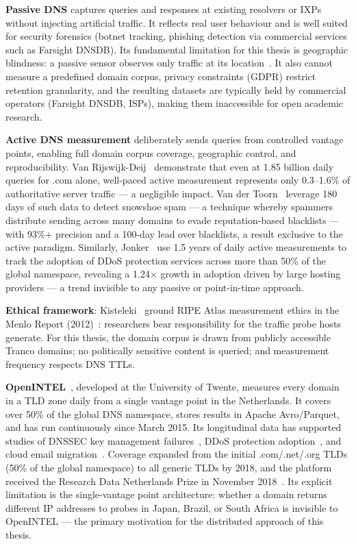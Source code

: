 \textbf{Passive \ac{DNS}} captures queries and responses at existing resolvers or \ac{IXPs} without injecting artificial traffic. It reflects real user behaviour and is well suited for security forensics (botnet tracking, phishing detection via commercial services such as Farsight DNSDB). Its fundamental limitation for this thesis is geographic blindness: a passive sensor observes only traffic at its location~\cite{vanRijswijk2016}. It also cannot measure a predefined domain corpus, privacy constraints (GDPR) restrict retention granularity, and the resulting datasets are typically held by commercial operators (Farsight DNSDB, \ac{ISP}s), making them inaccessible for open academic research.

\textbf{Active \ac{DNS} measurement} deliberately sends queries from controlled vantage points, enabling full domain corpus coverage, geographic control, and reproducibility. Van Rijswijk-Deij~\cite{vanRijswijk2016} demonstrate that even at 1.85 billion daily queries for .com alone, well-paced active measurement represents only 0.3–1.6\% of authoritative server traffic — a negligible impact. Van der Toorn~\cite{vanderToorn2018} leverage 180 days of such data to detect snowshoe spam — a technique whereby spammers distribute sending across many domains to evade reputation-based blacklists — with 93\%+ precision and a 100-day lead over blacklists, a result exclusive to the active paradigm. Similarly, Jonker~\cite{Jonker2016} use 1.5 years of daily active measurements to track the adoption of \ac{DDoS} protection services across more than 50\% of the global namespace, revealing a 1.24$\times$ growth in adoption driven by large hosting providers — a trend invisible to any passive or point-in-time approach.

\textbf{Ethical framework}: Kisteleki~\cite{Kisteleki2016} ground RIPE Atlas measurement ethics in the Menlo Report (2012)~\cite{Bailey2012}: researchers bear responsibility for the traffic probe hosts generate. For this thesis, the domain corpus is drawn from publicly accessible Tranco domains; no politically sensitive content is queried; and measurement frequency respects \ac{DNS} \ac{TTL}s.

\textbf{OpenINTEL}~\cite{vanRijswijk2016}, developed at the University of Twente, measures every domain in a \ac{TLD} zone daily from a single vantage point in the Netherlands. It covers over 50\% of the global \ac{DNS} namespace, stores results in Apache Avro/Parquet, and has run continuously since March 2015. Its longitudinal data has supported studies of \ac{DNSSEC} key management failures~\cite{Chung2017}, \ac{DDoS} protection adoption~\cite{Jonker2016}, and cloud email migration~\cite{vanRijswijk2018blog}. Coverage expanded from the initial .com/.net/.org \ac{TLD}s (50\% of the global namespace) to all generic \ac{TLD}s by 2018, and the platform received the Research Data Netherlands Prize in November 2018~\cite{vanRijswijk2018blog}. Its explicit limitation is the single-vantage point architecture: whether a domain returns different \ac{IP} addresses to probes in Japan, Brazil, or South Africa is invisible to OpenINTEL — the primary motivation for the distributed approach of this thesis.


